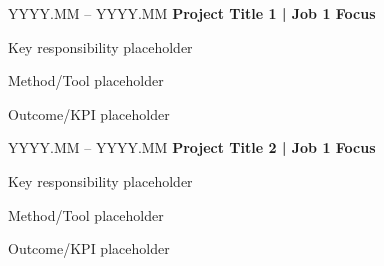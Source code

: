 \begin{twocolentry}{YYYY.MM -- YYYY.MM}
  \textbf{Project Title 1 | Job 1 Focus}
\end{twocolentry}
\begin{onecolentry}
  \begin{highlights}
    \item Key responsibility placeholder
    \item Method/Tool placeholder
    \item Outcome/KPI placeholder
  \end{highlights}
\end{onecolentry}

\entrysep

\begin{twocolentry}{YYYY.MM -- YYYY.MM}
  \textbf{Project Title 2 | Job 1 Focus}
\end{twocolentry}
\begin{onecolentry}
  \begin{highlights}
    \item Key responsibility placeholder
    \item Method/Tool placeholder
    \item Outcome/KPI placeholder
  \end{highlights}
\end{onecolentry}
